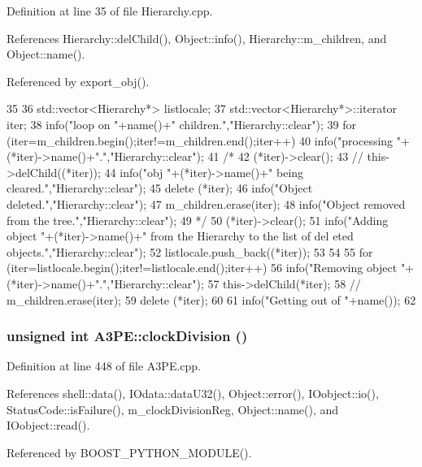 Definition at line 35 of file Hierarchy.cpp.

References Hierarchy::delChild(), Object::info(), Hierarchy::m\_\-children, and Object::name().

Referenced by export\_\-obj().


\begin{DoxyCode}
35                      {
36   std::vector<Hierarchy*> listlocale;
37   std::vector<Hierarchy*>::iterator iter;
38   info("loop on "+name()+" children.","Hierarchy::clear");
39   for (iter=m_children.begin();iter!=m_children.end();iter++){
40       info("processing "+(*iter)->name()+".","Hierarchy::clear");
41 /*
42       (*iter)->clear();
43 //      this->delChild((*iter));
44       info("obj "+(*iter)->name()+" being cleared.","Hierarchy::clear");
45       delete (*iter);
46       info("Object deleted.","Hierarchy::clear");
47       m_children.erase(iter);
48       info("Object removed from the tree.","Hierarchy::clear");
49 */
50     (*iter)->clear();
51     info("Adding object "+(*iter)->name()+" from the Hierarchy to the list of del
      eted objects.","Hierarchy::clear");
52     listlocale.push_back((*iter));
53   }
54 
55   for (iter=listlocale.begin();iter!=listlocale.end();iter++){
56     info("Removing object "+(*iter)->name()+".","Hierarchy::clear");
57     this->delChild(*iter);
58 //    m_children.erase(iter);
59     delete (*iter);
60   }
61   info("Getting out of "+name());
62 }
\end{DoxyCode}
\hypertarget{classA3PE_a81e32c82ca14f85fd7f26cd9a54f7a38}{
\subsubsection[{clockDivision}]{\setlength{\rightskip}{0pt plus 5cm}unsigned int A3PE::clockDivision ()}}
\label{classA3PE_a81e32c82ca14f85fd7f26cd9a54f7a38}


Definition at line 448 of file A3PE.cpp.

References shell::data(), IOdata::dataU32(), Object::error(), IOobject::io(), StatusCode::isFailure(), m\_\-clockDivisionReg, Object::name(), and IOobject::read().

Referenced by BOOST\_\-PYTHON\_\-MODULE().


